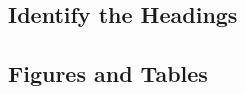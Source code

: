 \documentclass[conference]{IEEEtran}
\begin{document}
\subsection{Identify the Headings}
%
%

\subsection{Figures and Tables}
%
\end{document}

